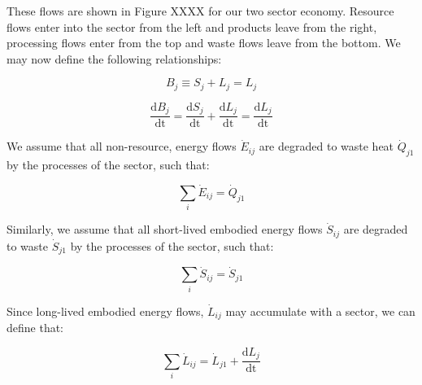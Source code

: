 \documentclass[authoryear,preprint,review,12pt]{elsarticle}
\begin{document}
These flows are shown in Figure XXXX for our two sector economy. Resource flows enter into the sector from the left and products leave from the right, processing flows enter from the top and waste flows leave from the bottom. We may now define the following relationships:

\begin{equation}\label{eq:D_def_S_L}
B_{j} \equiv S_{j} + L_{j} = L_{j}
\end{equation}



\begin{equation}\label{eq:D_def_acc_S_L}
\frac{\textrm{d}B_{j}}{\textrm{dt}} =\frac{\textrm{d}S_{j}}{\textrm{dt}} + \frac{\textrm{d}L_{j}}{\textrm{dt}} = \frac{\textrm{d}L_{j}}{\textrm{dt}}
\end{equation}

We assume that all non-resource, energy flows $\dot{E}_{ij}$ are degraded to waste heat $\dot{Q}_{j1}$ by the processes of the sector, such that:

\begin{equation}\label{eq:D_E_balance}
\sum_{i} \dot{E}_{ij} = \dot{Q}_{j1}
\end{equation}

Similarly, we assume that all short-lived embodied energy flows $\dot{S}_{ij}$ are degraded to waste $\dot{S}_{j1}$ by the processes of the sector, such that:

\begin{equation}\label{eq:D_S_balance}
\sum_{i} \dot{S}_{ij} = \dot{S}_{j1}
\end{equation}

Since long-lived embodied energy flows, $\dot{L}_{ij}$ may accumulate with a sector, we can define that:

\begin{equation}\label{eq:D_L_balance}
\sum_{i} \dot{L}_{ij} = \dot{L}_{j1} + \frac{\textrm{d}L_{j}}{\textrm{dt}}
\end{equation}

%
\end{document}
